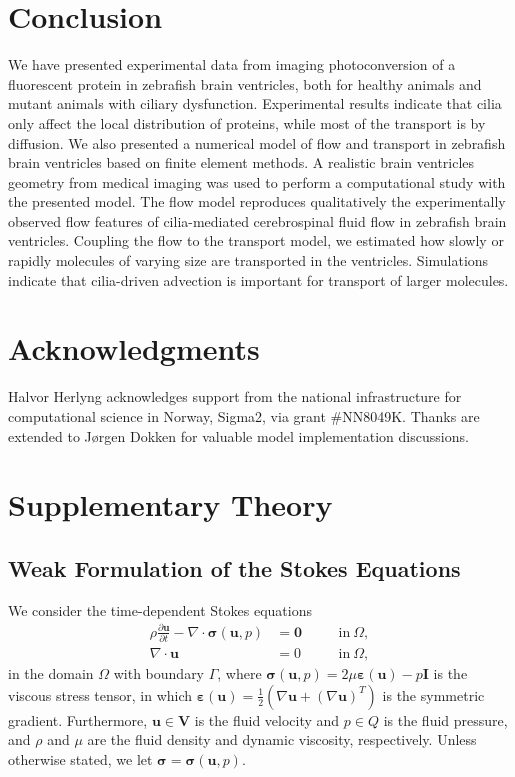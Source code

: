 \documentclass[fleqn]{wlscirep}
\newcommand{\pdifft}[1]{\frac{\partial  #1}{\partial t}}
\newcommand{\uu}{\mathbf{u}}
\newcommand{\VV}{\mathbf{V}}
\newcommand{\bsig}{\bm{\sigma}}
\newcommand{\beps}{\bm{\varepsilon}}
\begin{document}
\section*{Conclusion}
We have presented experimental data from imaging photoconversion of a fluorescent protein in zebrafish brain ventricles, both for healthy animals and mutant animals with ciliary dysfunction. Experimental results indicate that cilia only affect the local distribution of proteins, while most of the transport is by diffusion. We also presented a numerical model of flow and transport in zebrafish brain ventricles based on finite element methods. A realistic brain ventricles geometry from medical imaging was used to perform a computational study with the presented model. The flow model reproduces qualitatively the experimentally observed flow features of cilia-mediated cerebrospinal fluid flow in zebrafish brain ventricles. Coupling the flow to the transport model, we estimated how slowly or rapidly molecules of varying size are transported in the ventricles. Simulations indicate that cilia-driven advection is important for transport of larger molecules.


\section*{Acknowledgments}
Halvor Herlyng acknowledges support from the national infrastructure for computational science in Norway, Sigma2, via grant \#NN8049K. Thanks are extended to J\o rgen Dokken for valuable model implementation discussions.
\newpage


\appendix
\section{Supplementary Theory}
\subsection{Weak Formulation of the Stokes Equations}\label{subsec:appendixA1}
We consider the time-dependent Stokes equations
\begin{subequations}
\begin{alignat}{2}
   \rho\pdifft{\uu} - \nabla \cdot \bsig(\uu, p) &= \mathbf{0} \quad &&\mathrm{in} \ \Omega, \label{eq:BDM_stokes_mom}\\
  \nabla \cdot \uu &= 0 \quad &&\mathrm{in} \ \Omega, \label{eq:BDM_stokes_div} 
\end{alignat}
\label{eq:appendix_stokes_eqs}%
\end{subequations}%
in the domain $\Omega$ with boundary $\Gamma$, where $\bsig(\uu, p) = 2\mu\beps(\uu) - p\mathbf{I}$ is the viscous stress tensor, in which $\beps(\uu) = \frac{1}{2}(\nabla\uu + (\nabla\uu)^T)$ is the symmetric gradient. Furthermore, $\uu\in\VV$ is the fluid velocity and $p\in Q$ is the fluid pressure, and $\rho$ and $\mu$ are the fluid density and dynamic viscosity, respectively. Unless otherwise stated, we let $\bsig = \bsig(\uu, p)$. 
\end{document}
